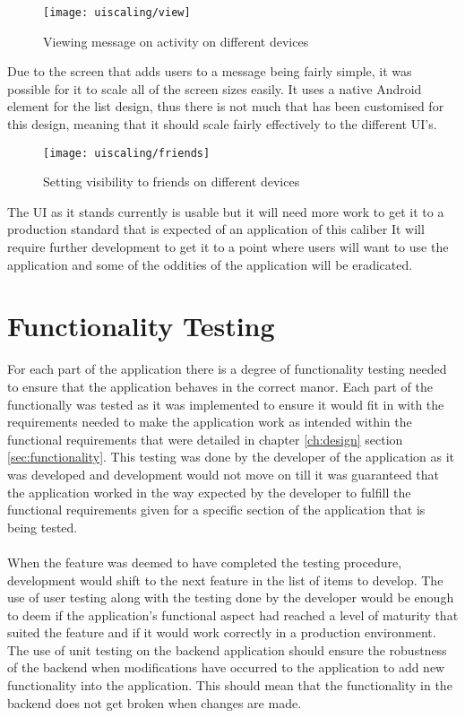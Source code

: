 \begin{figure}[H]
    \centering
    \texttt{[image: uiscaling/view]}
    \caption{Viewing message on activity on different devices}
    \label{fig:ui_scaling_view_image}
\end{figure} 

\noindent
Due to the screen that adds users to a message being fairly simple, it was possible for it to scale all of the screen sizes easily. It uses a native Android element for the list design, thus there is not much that has been customised for this design, meaning that it should scale fairly effectively to the different UI's.

\begin{figure}[H]
    \centering
    \texttt{[image: uiscaling/friends]}
    \caption{Setting visibility to friends on different devices}
    \label{fig:ui_scaling_friends_image}
\end{figure} 

\noindent
The UI as it stands currently is usable but it will need more work to get it to a production standard that is expected of an application of this caliber It will require further development to get it to a point where users will want to use the application and some of the oddities of the application will be eradicated.

\section{Functionality Testing}

For each part of the application there is a degree of functionality testing needed to ensure that the application behaves in the correct manor. Each part of the functionally was tested as it was implemented to ensure it would fit in with the requirements needed to make the application work as intended within the functional requirements that were detailed in chapter \ref{ch:design} section \ref{sec:functionality}. This testing was done by the developer of the application as it was developed and development would not move on till it was guaranteed that the application worked in the way expected by the developer to fulfill the functional requirements given for a specific section of the application that is being tested.\\
\\
When the feature was deemed to have completed the testing procedure, development would shift to the next feature in the list of items to develop. The use of user testing along with the testing done by the developer would be enough to deem if the application's functional aspect had reached a level of maturity that suited the feature and if it would work correctly in a production environment. The use of unit testing on the backend application should ensure the robustness of the backend when modifications have occurred to the application to add new functionality into the application. This should mean that the functionality in the backend does not get broken when changes are made.


